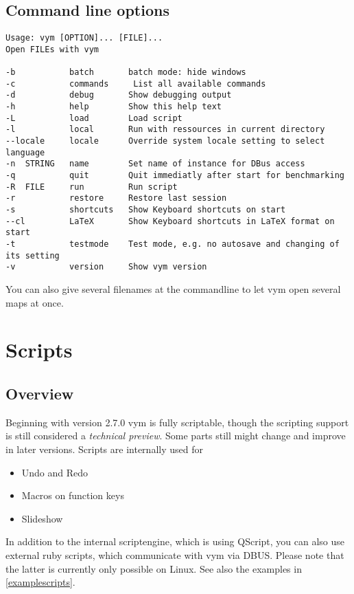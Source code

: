 \documentclass[12pt,a4paper]{article}
\newcommand{\vym}{{\sc vym }}
\begin{document}
\begin{appendix}
\subsection{Command line options} \label{options} 
\begin{verbatim}
Usage: vym [OPTION]... [FILE]... 
Open FILEs with vym

-b           batch       batch mode: hide windows
-c           commands	  List all available commands
-d           debug       Show debugging output
-h           help        Show this help text
-L           load        Load script
-l           local       Run with ressources in current directory
--locale     locale      Override system locale setting to select language
-n  STRING   name        Set name of instance for DBus access
-q           quit        Quit immediatly after start for benchmarking
-R  FILE     run         Run script
-r           restore     Restore last session
-s           shortcuts   Show Keyboard shortcuts on start
--cl         LaTeX       Show Keyboard shortcuts in LaTeX format on start
-t           testmode    Test mode, e.g. no autosave and changing of its setting
-v           version     Show vym version
\end{verbatim}
You can also give several filenames at the commandline to let \vym open
several maps at once.
 

\section{Scripts} \label{scripts}   
\subsection{Overview}
Beginning with version 2.7.0 \vym is fully scriptable, though the
scripting support is still considered a {\em technical preview}. Some
parts still might change and improve in later versions.
Scripts are internally used for
\begin{itemize}
    \item Undo and Redo
    \item Macros on function keys
    \item Slideshow
\end{itemize}
In addition to the internal scriptengine, which is using QScript, 
you can also  use external ruby scripts, which communicate with \vym via
DBUS. Please note that the latter is currently only possible on Linux.
See also the examples in \ref{examplescripts}.


\end{appendix}
\end{document}
